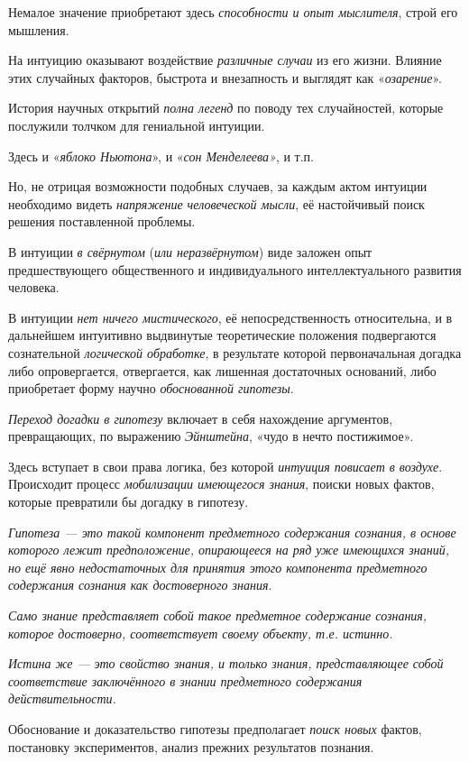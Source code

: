 \documentclass[a4paper,14pt,russian]{extreport}
\begin{document}
Немалое значение приобретают здесь \emph{способности и опыт мыслителя}, строй его мышления.

На интуицию оказывают воздействие \emph{различные случаи} из его жизни. Влияние этих случайных факторов, быстрота и внезапность и выглядят как «\emph{озарение}».

История научных открытий \emph{полна легенд} по поводу тех случайностей, которые послужили толчком для гениальной интуиции.

Здесь и «\emph{яблоко Ньютона}», и «\emph{сон Менделеева»}, и т.п.

Но, не отрицая возможности подобных случаев, за каждым актом интуиции необходимо видеть \emph{напряжение человеческой мысли}, её настойчивый поиск решения поставленной проблемы.

В интуиции \emph{в свёрнутом} (\emph{или неразвёрнутом}) виде заложен опыт предшествующего общественного и индивидуального интеллектуального развития человека.

В интуиции \emph{нет ничего мистического}, её непосредственность относительна, и в дальнейшем интуитивно выдвинутые теоретические положения подвергаются сознательной \emph{логической обработке}, в результате которой первоначальная догадка либо опровергается, отвергается, как лишенная достаточных оснований, либо приобретает форму научно \emph{обоснованной гипотезы}.

\emph{Переход догадки в гипотезу} включает в себя нахождение аргументов, превращающих, по выражению \emph{Эйнштейна}, «чудо в нечто постижимое».

Здесь вступает в свои права логика, без которой \emph{интуиция повисает в воздухе}. Происходит процесс \emph{мобилизации имеющегося знания}, поиски новых фактов, которые превратили бы догадку в гипотезу.

\emph{Гипотеза --- это такой компонент предметного содержания сознания, в основе которого лежит предположение, опирающееся на ряд уже имеющихся знаний, но ещё явно недостаточных для принятия этого компонента предметного содержания сознания как достоверного знания}.

\emph{Само знание представляет собой такое предметное содержание сознания, которое достоверно, соответствует своему объекту, т.е. истинно.}

\emph{Истина же ---} \emph{это свойство знания, и только знания, представляющее собой соответствие заключённого в знании предметного содержания действительности.}

Обоснование и доказательство гипотезы предполагает \emph{поиск новых} фактов, постановку экспериментов, анализ прежних результатов познания.
\end{document}

